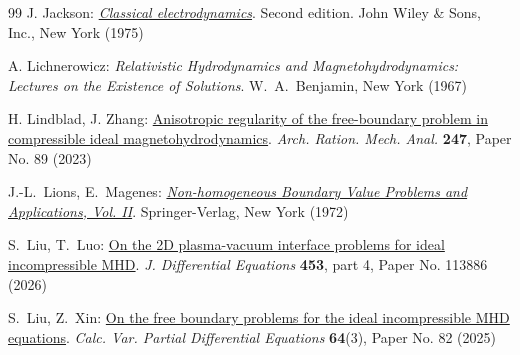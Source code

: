\documentclass[twoside,11pt]{article}
\numberwithin{equation}{section}
\begin{document}
{\begin{thebibliography}{99}
			 J. Jackson: \href{https://archive.org/details/ClassicalElectrodynamics2nd/page/n29/mode/2up}{\it Classical electrodynamics}. Second edition. John Wiley \& Sons, Inc., New York (1975)
			
			

			
			
			
			 A. Lichnerowicz: {\it Relativistic Hydrodynamics and Magnetohydrodynamics: Lectures on the Existence of Solutions}. W.~A.~Benjamin, New York (1967)

			
			
			 H. Lindblad, J. Zhang: \href{https://doi.org/10.1007/s00205-023-01917-1}{Anisotropic regularity of the free-boundary problem in compressible ideal magnetohydrodynamics}. {\it Arch. Ration. Mech. Anal.} {\bf 247}, Paper No. 89 (2023)
		
		  J.-L.~Lions, E.~Magenes: \href{https://doi.org/10.1007/978-3-642-65217-2}{{\it Non-homogeneous Boundary Value Problems and Applications, Vol. II}}. Springer-Verlag, New York (1972)				

 S.~Liu, T.~Luo: \href{https://doi.org/10.1016/j.jde.2025.113886}{On the 2D plasma-vacuum interface problems for ideal incompressible MHD}. {\it J. Differential Equations} {\bf 453}, part 4, Paper No. 113886  (2026)

 S.~Liu, Z.~Xin: \href{https://doi.org/10.1007/s00526-025-02941-7}{On the free boundary problems for the ideal incompressible MHD equations}. {\it Calc. Var. Partial Differential Equations} {\bf 64}(3),  Paper No. 82 (2025)
			

\end{thebibliography}}
\end{document}

